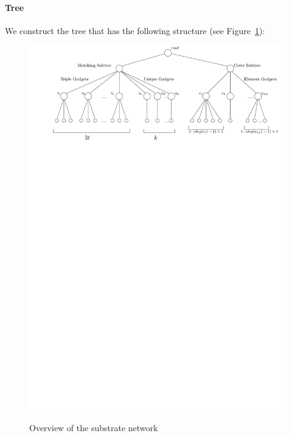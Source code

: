 \paragraph{Tree}

We construct the tree that has the following structure (see Figure~\ref{fig:red-ma}):

\begin{figure}[t]
  \centering
  \includegraphics[width=0.99\columnwidth]{figs/static-mapping/overview}
  \label{fig:red-ma}
  \vspace{-1em}
  \caption{Overview of the substrate network}
  \vspace{-1em}
\end{figure}

